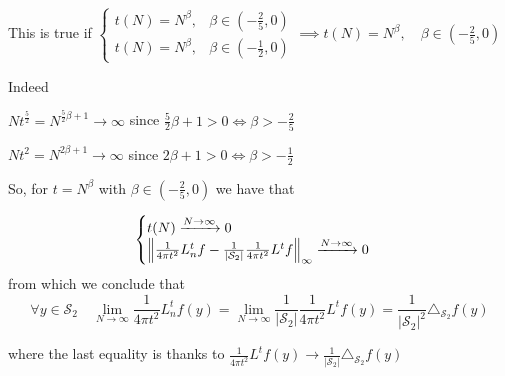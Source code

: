 This is true if $\begin{cases}
t(N) = N^\beta, &\beta\in(-\frac{2}{5}, 0) \\
t(N) = N^\beta, &\beta\in(-\frac{1}{2}, 0)
\end{cases} \implies t(N) = N^\beta, \quad \beta\in(-\frac{2}{5}, 0)$

Indeed 

$Nt^\frac{5}{2}=N^{\frac{5}{2}\beta+1}\rightarrow \infty$ since $\frac{5}{2}\beta+1>0 \iff \beta>-\frac{2}{5}$

$Nt^2=N^{2\beta+1}\rightarrow \infty$ since $2\beta+1>0 \iff \beta>-\frac{1}{2}$

So, for $t=N^\beta$ with $\beta\in(-\frac{2}{5}, 0)$ we have that 

$$\begin{cases}
t(N)\xrightarrow{N\to\infty}0\\
\left\lVert\frac{1}{4\pi t^2}L_n^tf-\frac{1}{|\mathcal S_2|}\frac{1}{4\pi t^2}L^tf\right\rVert_\infty  \xrightarrow{N\to\infty}0
\end{cases}$$
from which we conclude that
$$\forall y\in\mathcal S_2 \quad \lim_{N\to\infty}\frac{1}{4\pi t^2} L_n^tf(y) =  \lim_{N\to\infty}\frac{1}{|\mathcal S_2|}\frac{1}{4\pi t^2} L^tf(y) = \frac{1}{|\mathcal S_2|^2}\triangle_{\mathcal S_2}f(y) $$

where the last equality is thanks to $\frac{1}{4\pi t^2} L^tf(y) \rightarrow \frac{1}{|\mathcal S_2|}\triangle_{\mathcal S_2}f(y)$  \cite[Towards a theoretical  blablabla]{} 